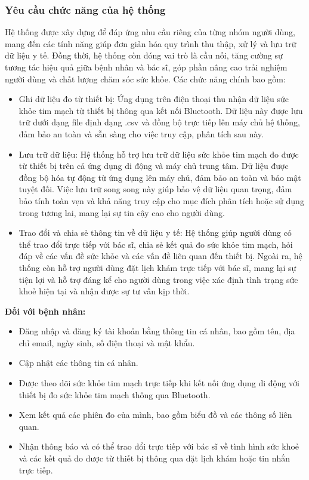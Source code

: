 \subsubsection{Yêu cầu chức năng của hệ thống}
Hệ thống được xây dựng để đáp ứng nhu cầu riêng của từng nhóm người dùng, mang đến các tính năng giúp đơn giản hóa quy trình thu thập, xử lý và lưu trữ dữ liệu y tế. Đồng thời, hệ thống còn đóng vai trò là cầu nối, tăng cường sự tương tác hiệu quả giữa bệnh nhân và bác sĩ, góp phần nâng cao trải nghiệm người dùng và chất lượng chăm sóc sức khỏe. Các chức năng chính bao gồm:
\begin{adjustwidth}{1.5em}{}
	\begin{itemize}
		\item Ghi dữ liệu đo từ thiết bị: Ứng dụng trên điện thoại thu nhận dữ liệu sức khỏe tim mạch từ thiết bị thông qua kết nối Bluetooth.
		      Dữ liệu này được lưu trữ dưới dạng file định dạng .csv và đồng bộ trực tiếp lên máy chủ hệ thống, đảm bảo an toàn và sẵn sàng cho việc truy cập, phân tích sau này.
		\item Lưu trữ dữ liệu: Hệ thống hỗ trợ lưu trữ dữ liệu sức khỏe tim mạch đo được từ thiết bị trên cả ứng dụng di động và máy chủ trung tâm. Dữ liệu được đồng bộ hóa tự động từ ứng dụng lên máy chủ, đảm bảo an toàn và bảo mật tuyệt đối. Việc lưu trữ song song này giúp bảo vệ dữ liệu quan trọng, đảm bảo tính toàn vẹn và khả năng truy cập cho mục đích phân tích hoặc sử dụng trong tương lai, mang lại sự tin cậy cao cho người dùng.
		\item Trao đổi và chia sẻ thông tin về dữ liệu y tế: Hệ thống giúp người dùng có thể trao đổi trực tiếp với bác sĩ, chia sẻ kết quả đo sức khỏe tim mạch, hỏi đáp về các vấn đề sức khỏe và các vấn đề liên quan đến thiết bị. Ngoài ra, hệ thống còn hỗ trợ người dùng đặt lịch khám trực tiếp với bác sĩ, mang lại sự tiện lợi và hỗ trợ đáng kể cho người dùng trong việc xác định tình trạng sức khoẻ hiện tại và nhận được sự tư vấn kịp thời.
	\end{itemize}
\end{adjustwidth}
\textbf{Đối với bệnh nhân:}
\begin{adjustwidth}{1.5em}{}
	\begin{itemize}
		\item Đăng nhập và đăng ký tài khoản bằng thông tin cá nhân, bao gồm tên, địa chỉ email, ngày sinh, số điện thoại và mật khẩu.
		\item Cập nhật các thông tin cá nhân.
		\item Được theo dõi sức khỏe tim mạch trực tiếp khi kết nối ứng dụng di động với thiết bị đo sức khỏe tim mạch thông qua Bluetooth.
		\item Xem kết quả các phiên đo của mình, bao gồm biểu đồ và các thông số liên quan.
		\item Nhận thông báo và có thể trao đổi trực tiếp với bác sĩ về tình hình sức khoẻ và các kết quả đo được từ thiết bị thông qua đặt lịch khám hoặc tin nhắn trực tiếp.
	\end{itemize}
\end{adjustwidth}
